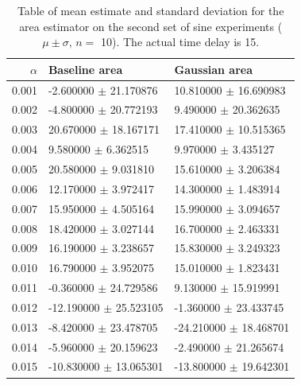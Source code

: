 \documentclass[a4paper,11pt]{article}
\begin{document}
\begin{appendices}
\begin{table}[htb]
\caption{Table of mean estimate and standard deviation for the area estimator on the second set of sine experiments ($\mu\pm\sigma,\,n=$ 10). The actual time delay is 15.} 
\begin{center}
\begin{tabular}{r|ll}
 $\alpha$  &  Baseline area               &  Gaussian area               \\
\hline
    0.001  &  -2.600000 $\pm$ 21.170876   &  10.810000 $\pm$ 16.690983   \\
    0.002  &  -4.800000 $\pm$ 20.772193   &  9.490000 $\pm$ 20.362635    \\
    0.003  &  20.670000 $\pm$ 18.167171   &  17.410000 $\pm$ 10.515365   \\
    0.004  &  9.580000 $\pm$ 6.362515     &  9.970000 $\pm$ 3.435127     \\
    0.005  &  20.580000 $\pm$ 9.031810    &  15.610000 $\pm$ 3.206384    \\
    0.006  &  12.170000 $\pm$ 3.972417    &  14.300000 $\pm$ 1.483914    \\
    0.007  &  15.950000 $\pm$ 4.505164    &  15.990000 $\pm$ 3.094657    \\
    0.008  &  18.420000 $\pm$ 3.027144    &  16.700000 $\pm$ 2.463331    \\
    0.009  &  16.190000 $\pm$ 3.238657    &  15.830000 $\pm$ 3.249323    \\
    0.010  &  16.790000 $\pm$ 3.952075    &  15.010000 $\pm$ 1.823431    \\
    0.011  &  -0.360000 $\pm$ 24.729586   &  9.130000 $\pm$ 15.919991    \\
    0.012  &  -12.190000 $\pm$ 25.523105  &  -1.360000 $\pm$ 23.433745   \\
    0.013  &  -8.420000 $\pm$ 23.478705   &  -24.210000 $\pm$ 18.468701  \\
    0.014  &  -5.960000 $\pm$ 20.159623   &  -2.490000 $\pm$ 21.265674   \\
    0.015  &  -10.830000 $\pm$ 13.065301  &  -13.800000 $\pm$ 19.642301  \\
\end{tabular}
\end{center}
\end{table}



\end{appendices}
\end{document}

